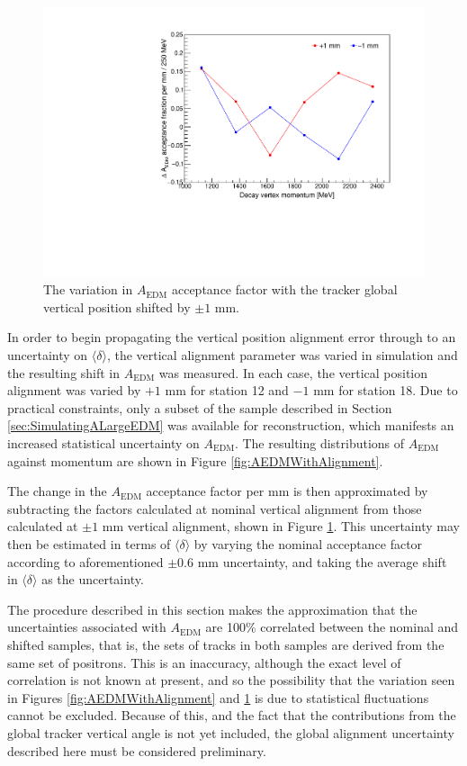 \begin{figure}[t!]
\centering{}
\includegraphics[trim={0 0 0 0cm},clip,width=.69\textwidth]{Images/Chapter5/AEDMAcceptanceUncOverlay.pdf}
\caption{The variation in $A_{\text{EDM}}$ acceptance factor with the tracker global vertical position shifted by $\pm1$ mm.} 
\label{fig:AEDMAlignmentUnc}
\end{figure} 

In order to begin propagating the vertical position alignment error through to an uncertainty on $\langle \delta \rangle$, the vertical alignment parameter was varied in simulation and the resulting shift in $A_{\text{EDM}}$ was measured. In each case, the vertical position alignment was varied by $+1$ mm for station 12 and $-1$ mm for station 18. Due to practical constraints, only a subset of the sample described in Section \ref{sec:SimulatingALargeEDM} was available for reconstruction, which manifests an increased statistical uncertainty on $A_{\text{EDM}}$. The resulting distributions of $A_{\text{EDM}}$ against momentum are shown in Figure \ref{fig:AEDMWithAlignment}. 

The change in the $A_{\text{EDM}}$ acceptance factor per mm is then approximated by subtracting the factors calculated at nominal vertical alignment from those calculated at $\pm1$ mm vertical alignment, shown in Figure \ref{fig:AEDMAlignmentUnc}. This uncertainty may then be estimated in terms of $\langle \delta \rangle$ by varying the nominal acceptance factor according to aforementioned $\pm0.6$ mm uncertainty, and taking the average shift in $\langle \delta \rangle$ as the uncertainty. 

The procedure described in this section makes the approximation that the uncertainties associated with $A_{\text{EDM}}$ are 100\% correlated between the nominal and shifted samples, that is, the sets of tracks in both samples are derived from the same set of positrons. This is an inaccuracy, although the exact level of correlation is not known at present, and so the possibility that the variation seen in Figures \ref{fig:AEDMWithAlignment} and \ref{fig:AEDMAlignmentUnc} is due to statistical fluctuations cannot be excluded. Because of this, and the fact that the contributions from the global tracker vertical angle is not yet included, the global alignment uncertainty described here must be considered preliminary. 

